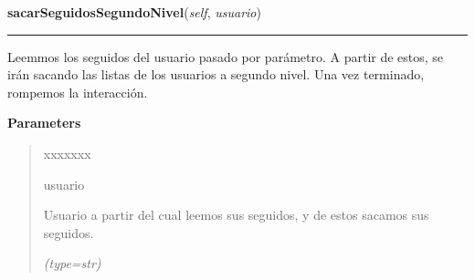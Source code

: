     \label{grafo:Grafo:sacarSeguidosSegundoNivel}

    \vspace{0.5ex}

\hspace{.8\funcindent}\begin{boxedminipage}{\funcwidth}

    \raggedright \textbf{sacarSeguidosSegundoNivel}(\textit{self}, \textit{usuario})

    \vspace{-1.5ex}

    \rule{\textwidth}{0.5\fboxrule}
\setlength{\parskip}{2ex}
    Leemmos los seguidos del usuario pasado por parámetro. A partir de 
    estos, se irán sacando las listas de los usuarios a segundo nivel. Una 
    vez terminado, rompemos la interacción.

\setlength{\parskip}{1ex}
      \textbf{Parameters}
      \vspace{-1ex}

      \begin{quote}
        \begin{Ventry}{xxxxxxx}

          \item[usuario]

          Usuario a partir del cual leemos sus seguidos, y de estos sacamos
          sus seguidos.

            {\it (type=str)}

        \end{Ventry}

      \end{quote}

    \end{boxedminipage}

    \label{grafo:Grafo:leerDocumentoAlgunasCategorias}

    \vspace{0.5ex}

